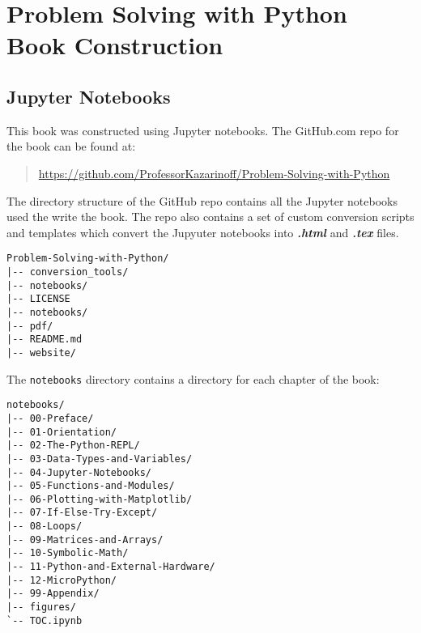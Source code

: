 \documentclass{book}
\newcommand{\passthrough}[1]{#1}
\begin{document}
    
        \hypertarget{problem-solving-with-python-book-construction}{%
\section{Problem Solving with Python Book
Construction}\label{problem-solving-with-python-book-construction}}
    




    
        \hypertarget{jupyter-notebooks}{%
\subsection{Jupyter Notebooks}\label{jupyter-notebooks}}
    




    
        This book was constructed using Jupyter notebooks. The GitHub.com repo
for the book can be found at:

\begin{quote}
\url{https://github.com/ProfessorKazarinoff/Problem-Solving-with-Python}
\end{quote}
    




    
        The directory structure of the GitHub repo contains all the Jupyter
notebooks used the write the book. The repo also contains a set of
custom conversion scripts and templates which convert the Jupyuter
notebooks into \textbf{\emph{.html}} and \textbf{\emph{.tex}} files.
    




    
        \begin{lstlisting}
Problem-Solving-with-Python/
|-- conversion_tools/
|-- notebooks/
|-- LICENSE
|-- notebooks/
|-- pdf/
|-- README.md
|-- website/
\end{lstlisting}
    




    
        The \passthrough{\lstinline!notebooks!} directory contains a directory
for each chapter of the book:
    




    
        \begin{lstlisting}
notebooks/
|-- 00-Preface/
|-- 01-Orientation/
|-- 02-The-Python-REPL/
|-- 03-Data-Types-and-Variables/
|-- 04-Jupyter-Notebooks/
|-- 05-Functions-and-Modules/
|-- 06-Plotting-with-Matplotlib/
|-- 07-If-Else-Try-Except/
|-- 08-Loops/
|-- 09-Matrices-and-Arrays/
|-- 10-Symbolic-Math/
|-- 11-Python-and-External-Hardware/
|-- 12-MicroPython/
|-- 99-Appendix/
|-- figures/
`-- TOC.ipynb
\end{lstlisting}
\end{document}
